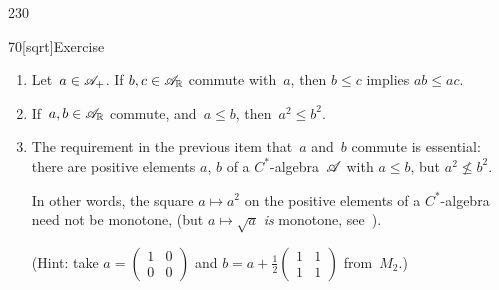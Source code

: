 \begin{parsec}{230}
\begin{point}{70}[sqrt]{Exercise}
\begin{enumerate}
\item
Let~$a\in\mathscr{A}_{+}$.
If $b,c\in \mathscr{A}_{\mathbb{R}}$ commute with~$a$,
then $b\leq c$ implies $ab\leq ac$.

\item
If~$a,b\in\mathscr{A}_{\mathbb{R}}$ commute, and~$a\leq b$, then~$a^2\leq b^2$.

\item
The requirement in the previous item  that~$a$ and~$b$ commute is essential:
there are positive elements $a$, $b$ of a $C^*$-algebra~$\mathscr{A}$
with $a\leq b$, but $a^2 \nleq b^2$.

In other words, the square $a\mapsto a^2$
on the positive elements of a $C^*$-algebra
need not be monotone,
(but $a\mapsto \sqrt{a}$ \emph{is} monotone, see~).

(Hint: take $a=(\begin{smallmatrix}1&0\\0&0\end{smallmatrix})$
and $b=a+\frac{1}{2}(\begin{smallmatrix}1&1\\1&1\end{smallmatrix})$
from~$M_2$.)
\end{enumerate}%
\spacingfix{}%
\end{point}%
\end{parsec}%
